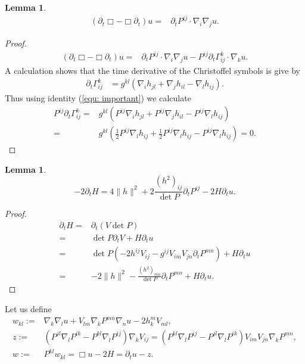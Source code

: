 \documentclass{amsart}
\newtheorem{lemma}[theorem]{Lemma}
\theoremstyle{definition}
\theoremstyle{remark}
\numberwithin{equation}{section}
\begin{document}
\begin{lemma}
\begin{align}
(\partial_t \Box-\Box\partial_t) u=&\partial_tP^{ij}\cdot\nabla_i\nabla_ju.
\end{align}
\end{lemma}
\begin{proof}
\begin{align*}
(\partial_t \Box-\Box \partial_t)u
=&\partial_tP^{ij}\cdot\nabla_i\nabla_ju-P^{ij}\partial_t\Gamma_{ij}^k\cdot\nabla_ku.
\end{align*}
A calculation shows that the time derivative of the Christoffel symbols is give by
\begin{align}
\partial_t \Gamma_{ij}^k&=g^{kl}\left(\nabla_ih_{jl}+\nabla_jh_{il}-\nabla_{l}h_{ij}\right).
\end{align}
Thus using identity (\ref{equ: important}) we calculate
\begin{align*}
P^{ij}\partial_t \Gamma_{ij}^k=&g^{kl}\left(P^{ij}\nabla_ih_{jl}+P^{ij}\nabla_jh_{il}-P^{ij}\nabla_{l}h_{ij}\right)\\
=&g^{kl}\left(\frac{1}{2}P^{ij}\nabla_lh_{ij}+\frac{1}{2}P^{ij}\nabla_lh_{ij}-P^{ij}\nabla_{l}h_{ij}\right)=0.
\end{align*}
\end{proof}
\begin{lemma}
\begin{equation}
-2\partial_tH=4\|h\|^2+2\frac{(h^2)_{ij}}{\det P}\partial_tP^{ij}-2H\partial_tu.
\end{equation}
\end{lemma}
\begin{proof}
\begin{align*}
\partial_tH=&\partial_t(V\det P)\\
=&\det P\partial_t V+H\partial_tu\\
=&\det P(-2h^{ij}V_{ij}-g^{ij}V_{im}V_{jn}\partial_tP^{mn})+H\partial_tu\\
=&-2\|h\|^2-\frac{(h^2)_{mn}}{\det P}\partial_tP^{mn}+H\partial_tu.
\end{align*}
\end{proof}
Let us define
\begin{align*}
w_{kl}:=&\nabla_k\nabla_lu+V_{lm}\nabla_kP^{mn}\nabla_nu-2h_k^mV_{ml},\\
z:=&\left(P^{jl}\nabla_lP^{ik}-P^{kl}\nabla_l P^{ij}\right)\nabla_kV_{ij}=\left(P^{kl}\nabla_l P^{ij}-P^{jl}\nabla_lP^{ik}\right)V_{im}V_{jn}\nabla_kP^{mn},\\
w:=&P^{kl}w_{kl}=\Box u-2H=\partial_tu-z.\\
\end{align*}
\end{document}
